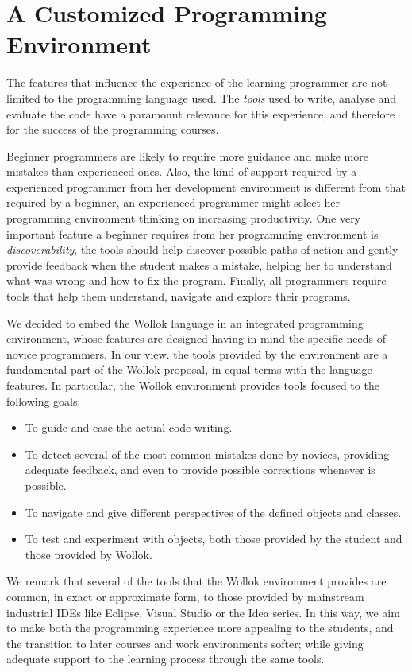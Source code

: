 \section{A Customized Programming Environment}
\label{sec:environment}


The features that influence the experience of the learning programmer are not limited to the programming language used. 
The \emph{tools} used to write, analyse and evaluate the code have a paramount relevance for this experience, and therefore for the success of the programming courses.

Beginner programmers are likely to require more guidance and make more mistakes than experienced ones.
Also, the kind of support required by a experienced programmer from her development environment is different from that required by a beginner, \eg an experienced programmer might select her programming environment thinking on increasing productivity.
One very important feature a beginner requires from her programming environment is \emph{discoverability}, \ie the tools should help discover possible paths of action and gently provide feedback when the student makes a mistake, helping her to understand what was wrong and how to fix the program.
Finally, all programmers require tools that help them understand, navigate and explore their programs.

We decided to embed the Wollok language in an integrated programming environment, whose features are designed having in mind the specific needs of novice programmers.
In our view. the tools provided by the environment are a fundamental part of the Wollok proposal, in equal terms with the language features.
In particular, the Wollok environment provides tools focused to the following goals:
\begin{itemize}
\item To guide and ease the actual code writing.
\item To detect several of the most common mistakes done by novices, providing adequate feedback, and even to provide possible corrections whenever is possible.
\item To navigate and give different perspectives of the defined objects and classes.
\item To test and experiment with objects, both those provided by the student and those provided by Wollok.
\end{itemize}

	We remark that several of the tools that the Wollok environment provides are common, in exact or approximate form, to those provided by mainstream industrial IDEs like Eclipse, Visual Studio or the Idea series. In this way, we aim to make both the programming experience more appealing to the students, and the transition to later courses and work environments softer; while giving adequate support to the learning process through the same tools.



